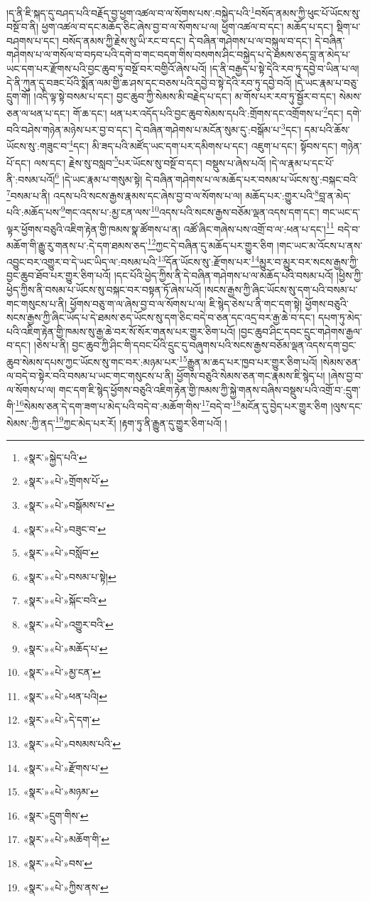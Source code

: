 །ད་ནི་ཇི་སྐད་དུ་བཤད་པའི་བརྗོད་བྱ་ཕྱག་འཚལ་བ་ལ་སོགས་པས་:བསྐྱེད་པའི་\footnote{«སྣར་»སྐྱེད་པའི་}བསོད་ནམས་ཀྱི་ཕུང་པོ་ཡོངས་སུ་བསྔོ་བ་ནི། ཕྱག་འཚལ་བ་དང་མཆོད་ཅིང་ཞེས་བྱ་བ་ལ་སོགས་པ་ལ། ཕྱག་འཚལ་བ་དང་། མཆོད་པ་དང་། སྡིག་པ་བཤགས་པ་དང་། བསོད་ནམས་ཀྱི་རྗེས་སུ་ཡི་རང་བ་དང་། དེ་བཞིན་གཤེགས་པ་ལ་བསྐུལ་བ་དང་། དེ་བཞིན་གཤེགས་པ་ལ་གསོལ་བ་བཏབ་པའི་དགེ་བ་གང་བདག་གིས་བསགས་ཤིང་བསྐྱེད་པ་དེ་ཐམས་ཅད་བླ་ན་མེད་པ་ཡང་དག་པར་རྫོགས་པའི་བྱང་ཆུབ་ཏུ་བསྔོ་བར་བགྱིའོ་ཞེས་པའོ། །ད་ནི་བརྒྱད་པ་སྟེ་དེའི་རབ་ཏུ་དབྱེ་བ་ཡིན་པ་ལ། དེ་ནི་ཀུན་དུ་བཟང་པོའི་སྨོན་ལམ་གྱི་ཆ་ཤས་དང་བཅས་པའི་དབྱེ་བ་སྟེ་དེའི་རབ་ཏུ་དབྱེ་བའོ། །དེ་ཡང་རྣམ་པ་བཅུ་དྲུག་གོ། །འདི་ལྟ་སྟེ་བསམ་པ་དང་། བྱང་ཆུབ་ཀྱི་སེམས་མི་བརྗེད་པ་དང་། མ་གོས་པར་རབ་ཏུ་སྦྱོར་བ་དང་། སེམས་ཅན་ལ་ཕན་པ་དང་། གོ་ཆ་དང་། ཕན་པར་འདོད་པའི་བྱང་ཆུབ་སེམས་དཔའི་:གྲོགས་དང་འགྲོགས་པ་\footnote{«སྣར་»«པེ་»གྲོགས་པོ་}དང་། དགེ་བའི་བཤེས་གཉེན་མཉེས་པར་བྱ་བ་དང་། དེ་བཞིན་གཤེགས་པ་མངོན་སུམ་དུ་:བསྒོམ་པ་\footnote{«སྣར་»«པེ་»བསྒོམས་པ་}དང་། དམ་པའི་ཆོས་ཡོངས་སུ་:གཟུང་བ་\footnote{«སྣར་»«པེ་»བཟུང་བ་}དང་། མི་ཟད་པའི་མཛོད་ཡང་དག་པར་དམིགས་པ་དང་། འཇུག་པ་དང་། སྟོབས་དང་། གཉེན་པོ་དང་། ལས་དང་། རྗེས་སུ་བསླབ་\footnote{«སྣར་»«པེ་»བསློབ་}པར་ཡོངས་སུ་བསྔོ་བ་དང་། བསྡུས་པ་ཞེས་པའོ། །དེ་ལ་རྣམ་པ་དང་པོ་ནི་:བསམ་པའོ།\footnote{«སྣར་»«པེ་»བསམ་པ་སྟེ།} །དེ་ཡང་རྣམ་པ་གསུམ་སྟེ། དེ་བཞིན་གཤེགས་པ་ལ་མཆོད་པར་བསམ་པ་ཡོངས་སུ་:བསྐང་བའི་\footnote{«སྣར་»«པེ་»སྐོང་བའི་}བསམ་པ་ནི། འདས་པའི་སངས་རྒྱས་རྣམས་དང་ཞེས་བྱ་བ་ལ་སོགས་པ་ལ། མཆོད་པར་:གྱུར་པའི་\footnote{«སྣར་»«པེ་»འགྱུར་བའི་}བླ་ན་མེད་པའི་:མཆོད་པས་\footnote{«སྣར་»«པེ་»མཆོད་པ་}གང་འདས་པ་:མྱ་ངན་ལས་\footnote{«སྣར་»«པེ་»མྱ་ངན་}འདས་པའི་སངས་རྒྱས་བཅོམ་ལྡན་འདས་དག་དང་། གང་ཡང་ད་ལྟར་ཕྱོགས་བཅུའི་འཇིག་རྟེན་གྱི་ཁམས་སྣ་ཚོགས་པ་ན། འཚོ་ཞིང་གཞེས་པས་འགྲོ་བ་ལ་:ཕན་པ་དང་།\footnote{«སྣར་»«པེ་»ཕན་པའི།} བདེ་བ་མཆོག་གི་རྒྱུ་རུ་གནས་པ་:དེ་དག་ཐམས་ཅད་\footnote{«སྣར་»«པེ་»དེ་དག་}ཀྱང་དེ་བཞིན་དུ་མཆོད་པར་གྱུར་ཅིག །གང་ཡང་མ་འོངས་པ་ནས་འབྱུང་བར་འགྱུར་བ་དེ་ཡང་ཡིད་ལ་:བསམ་པའི་\footnote{«སྣར་»«པེ་»བསམས་པའི་}དོན་ཡོངས་སུ་:རྫོགས་པར་\footnote{«སྣར་»«པེ་»རྫོགས་པ་}མྱུར་བ་མྱུར་བར་སངས་རྒྱས་ཀྱི་བྱང་ཆུབ་ཐོབ་པར་གྱུར་ཅིག་པའོ། །དང་པོའི་ཕྱེད་ཀྱིས་ནི་དེ་བཞིན་གཤེགས་པ་ལ་མཆོད་པའི་བསམ་པའོ། །ཕྱིས་ཀྱི་ཕྱེད་ཀྱིས་ནི་བསམ་པ་ཡོངས་སུ་བསྐང་བར་བསྟན་ཏོ་ཞེས་པའོ། །སངས་རྒྱས་ཀྱི་ཞིང་ཡོངས་སུ་དག་པའི་བསམ་པ་གང་གསུངས་པ་ནི། ཕྱོགས་བཅུ་ག་ལ་ཞེས་བྱ་བ་ལ་སོགས་པ་ལ། ཇི་སྙེད་ཅེས་པ་ནི་གང་དག་སྟེ། ཕྱོགས་བཅུའི་སངས་རྒྱས་ཀྱི་ཞིང་ཡོད་པ་དེ་ཐམས་ཅད་ཡོངས་སུ་དག་ཅིང་བདེ་བ་ཅན་དང་འདྲ་བར་རྒྱ་ཆེ་བ་དང་། དཔག་ཏུ་མེད་པའི་འཇིག་རྟེན་གྱི་ཁམས་སུ་རྒྱ་ཆེ་བར་སོ་སོར་གནས་པར་གྱུར་ཅིག་པའོ། །བྱང་ཆུབ་ཤིང་དབང་དྲུང་གཤེགས་རྒྱལ་བ་དང་། །ཅེས་པ་ནི། བྱང་ཆུབ་ཀྱི་ཤིང་གི་དབང་པོའི་དྲུང་དུ་བཞུགས་པའི་སངས་རྒྱས་བཅོམ་ལྡན་འདས་དག་བྱང་ཆུབ་སེམས་དཔས་ཀྱང་ཡོངས་སུ་གང་བར་:མཉམ་པར་\footnote{«སྣར་»«པེ་»མཉམ་}རྒྱུན་མ་ཆད་པར་ཁྱབ་པར་གྱུར་ཅིག་པའོ། །སེམས་ཅན་ལ་བདེ་བ་སྟེར་བའི་བསམ་པ་ཡང་གང་གསུངས་པ་ནི། ཕྱོགས་བཅུའི་སེམས་ཅན་གང་རྣམས་ཇི་སྙེད་པ། །ཞེས་བྱ་བ་ལ་སོགས་པ་ལ། གང་དག་ཇི་སྙེད་ཕྱོགས་བཅུའི་འཇིག་རྟེན་གྱི་ཁམས་ཀྱི་སྐྱེ་གནས་བཞིས་བསྡུས་པའི་འགྲོ་བ་:དྲུག་གི་\footnote{«སྣར་»དྲུག་གིས་}སེམས་ཅན་དེ་དག་ཟག་པ་མེད་པའི་བདེ་བ་:མཆོག་གིས་\footnote{«སྣར་»«པེ་»མཆོག་གི་}བདེ་བ་\footnote{«སྣར་»«པེ་»བས་}མངོན་དུ་བྱེད་པར་གྱུར་ཅིག །ལུས་དང་སེམས་:ཀྱི་ནད་\footnote{«སྣར་»«པེ་»ཀྱིས་ནས་}ཀྱང་མེད་པར་རོ། །རྟག་ཏུ་ནི་རྒྱུན་དུ་གྱུར་ཅིག་པའོ། །
